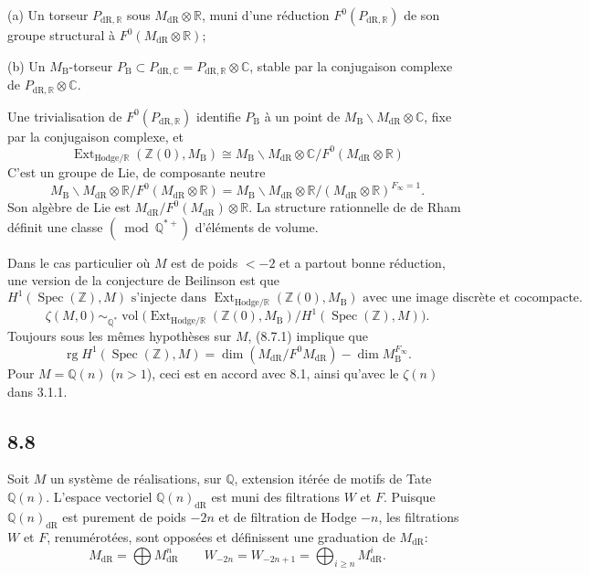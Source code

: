 \documentclass[12pt,a4paper]{article}
\theoremstyle{plain}
\theoremstyle{definition}
\theoremstyle{remark}
\DeclareMathOperator{\Spec}{Spec}
\DeclareMathOperator{\Ext}{Ext}
\DeclareMathOperator{\rank}{rg}
\DeclareMathOperator{\vol}{vol}
\newcommand{\DR}{\mathrm{dR}}
\newcommand{\B}{\mathrm{B}}
\newcommand{\Z}{\mathbb{Z}}
\newcommand{\Q}{\mathbb{Q}}
\newcommand{\C}{\mathbb{C}}
\newcommand{\R}{\mathbb{R}}
\begin{document}
(a) Un torseur $P_{\DR,\R}$ sous $M_\DR \otimes \R$, muni d'une r\'eduction $F^0(P_{\DR,\R})$ de son groupe structural \`a $F^0(M_\DR \otimes \R)$;

(b) Un $M_\B$-torseur $P_\B \subset P_{\DR,\C} = P_{\DR,\R} \otimes \C$, stable par la conjugaison complexe de $P_{\DR,\R} \otimes \C$.

Une trivialisation de $F^0(P_{\DR,\R})$ identifie $P_\B$ \`a un point de $M_\B \backslash M_\DR \otimes \C$, fixe par la conjugaison complexe, et
\[
\Ext_{\mathrm{Hodge}/\R}(\Z(0), M_\B) \cong M_\B \backslash M_\DR \otimes \C / F^0(M_\DR \otimes \R)
\]
C'est un groupe de Lie, de composante neutre
\[
M_\B \backslash M_\DR \otimes \R / F^0(M_\DR \otimes \R) = M_\B \backslash M_\DR \otimes \R / (M_\DR \otimes \R)^{F_\infty = 1}.
\]
Son alg\`ebre de Lie est $M_\DR / F^0(M_\DR) \otimes \R$. La structure rationnelle de de Rham d\'efinit une classe $(\bmod \Q^{*+})$ d'\'el\'ements de volume.

Dans le cas particulier o\`u $M$ est de poids $< -2$ et a partout bonne r\'eduction, une version de la conjecture de Beilinson est que
\begin{equation*}\tag{8.7.1}
H^1(\Spec(\Z), M) \text{ s'injecte dans } \Ext_{\mathrm{Hodge}/\R}(\Z(0), M_\B) \text{ avec une image discr\`ete et cocompacte.}
\end{equation*}
\begin{equation*}\tag{8.7.2}
\zeta(M, 0) \sim_{\Q^*} \vol\bigl(\Ext_{\mathrm{Hodge}/\R}(\Z(0), M_\B) / H^1(\Spec(\Z), M)\bigr).
\end{equation*}
Toujours sous les m\^emes hypoth\`eses sur $M$, (8.7.1) implique que
\begin{equation*}\tag{8.7.3}
\rank H^1(\Spec(\Z), M) = \dim(M_\DR / F^0 M_\DR) - \dim M_\B^{F_\infty}.
\end{equation*}
Pour $M = \Q(n)$ ($n > 1$), ceci est en accord avec 8.1, ainsi qu'avec le $\zeta(n)$ dans 3.1.1.

\subsection*{8.8}
Soit $M$ un syst\`eme de r\'ealisations, sur $\Q$, extension it\'er\'ee de motifs de Tate $\Q(n)$. L'espace vectoriel $\Q(n)_\DR$ est muni des filtrations $W$ et $F$. Puisque $\Q(n)_\DR$ est purement de poids $-2n$ et de filtration de Hodge $-n$, les filtrations $W$ et $F$, renum\'erot\'ees, sont oppos\'ees et d\'efinissent une graduation de $M_\DR$:
\begin{equation*}\tag{8.8.1}
M_\DR = \bigoplus M_\DR^n \qquad W_{-2n} = W_{-2n+1} = \bigoplus_{i \geq n} M_\DR^i.
\end{equation*}
\end{document}
